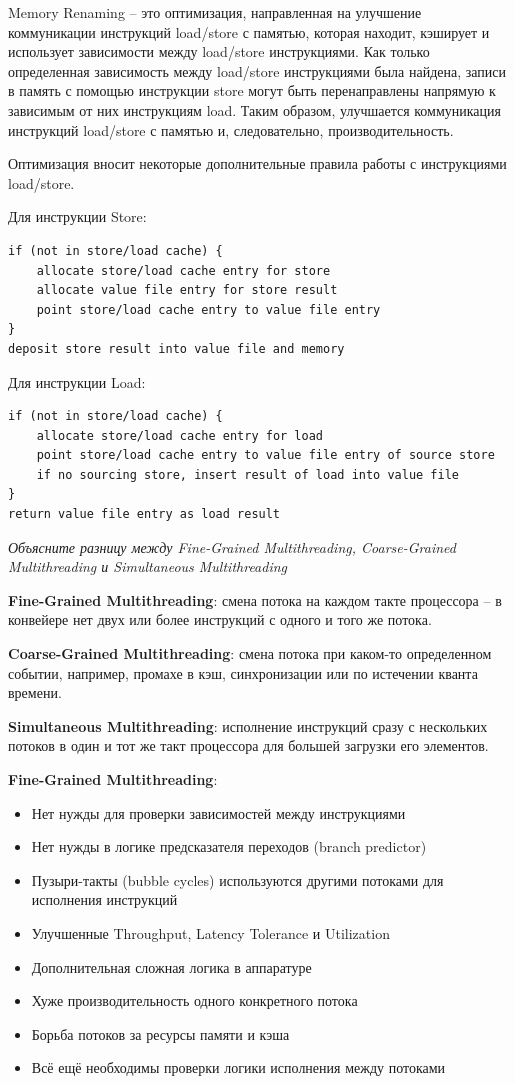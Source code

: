 	Memory Renaming -- это оптимизация, направленная на улучшение коммуникации инструкций load/store с памятью, которая находит, кэширует и использует зависимости между load/store инструкциями. Как только определенная зависимость между load/store инструкциями была найдена, записи в память с помощью инструкции store могут быть перенаправлены напрямую к зависимым от них инструкциям load. Таким образом, улучшается коммуникация инструкций load/store с памятью и, следовательно, производительность.

	Оптимизация вносит некоторые дополнительные правила работы с инструкциями load/store.
	
	Для инструкции Store:
	\begin{verbatim}
if (not in store/load cache) {
    allocate store/load cache entry for store
    allocate value file entry for store result
    point store/load cache entry to value file entry
}
deposit store result into value file and memory
	\end{verbatim}
	
	Для инструкции Load:
	\begin{verbatim}
if (not in store/load cache) {
    allocate store/load cache entry for load
    point store/load cache entry to value file entry of source store
    if no sourcing store, insert result of load into value file
}
return value file entry as load result
	\end{verbatim}
	
	\textit{Объясните разницу между Fine-Grained Multithreading, Coarse-Grained\\ Multithreading и Simultaneous Multithreading}
	
	\textbf{Fine-Grained Multithreading}: смена потока на каждом такте процессора -- в конвейере нет двух или более инструкций с одного и того же потока.
	
	\textbf{Coarse-Grained Multithreading}: смена потока при каком-то определенном событии, например, промахе в кэш, синхронизации или по истечении кванта времени.
	
	\textbf{Simultaneous Multithreading}: исполнение инструкций сразу с нескольких потоков в один и тот же такт процессора для большей загрузки его элементов.
	
	\textbf{Fine-Grained Multithreading}:
	\begin{itemize}
		\item Нет нужды для проверки зависимостей между инструкциями
		\item Нет нужды в логике предсказателя переходов (branch predictor)
		\item Пузыри-такты (bubble cycles) используются другими потоками для исполнения инструкций
		\item Улучшенные Throughput, Latency Tolerance и Utilization
		\item Дополнительная сложная логика в аппаратуре
		\item Хуже производительность одного конкретного потока
		\item Борьба потоков за ресурсы памяти и кэша
		\item Всё ещё необходимы проверки логики исполнения между потоками
	\end{itemize}
	
